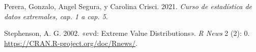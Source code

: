 \documentclass[
  oneside]{article}
\newlength{\cslhangindent}
\newlength{\cslentryspacingunit} %
\newenvironment{CSLReferences}[2] %
 {%
  \setlength{\parindent}{0pt}
  \ifodd #1
  \let\oldpar\par
  \def\par{\hangindent=\cslhangindent\oldpar}
  \fi
  \setlength{\parskip}{#2\cslentryspacingunit}
 }%
 {}
\begin{document}
\hypertarget{refs}{}
\begin{CSLReferences}{1}{0}
\leavevmode{}%
Perera, Gonzalo, Angel Segura, y Carolina Crisci. 2021. \emph{Curso de
estadística de datos extremales, cap. 1 a cap. 5}.

\leavevmode{}%
Stephenson, A. G. 2002. {«evd: Extreme Value Distributions»}. \emph{R
News} 2 (2): 0. \url{https://CRAN.R-project.org/doc/Rnews/}.

\end{CSLReferences}
\end{document}
